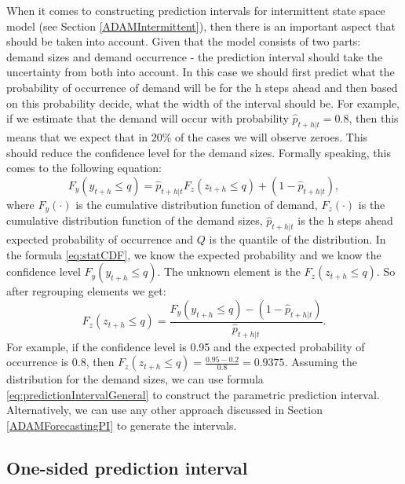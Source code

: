\documentclass[
]{book}
\theoremstyle{definition}
\theoremstyle{definition}
\theoremstyle{definition}
\theoremstyle{definition}
\theoremstyle{remark}
\begin{document}
When it comes to constructing prediction intervals for intermittent state space model (see Section \ref{ADAMIntermittent}), then there is an important aspect that should be taken into account. Given that the model consists of two parts: demand sizes and demand occurrence - the prediction interval should take the uncertainty from both into account. In this case we should first predict what the probability of occurrence of demand will be for the h steps ahead and then based on this probability decide, what the width of the interval should be. For example, if we estimate that the demand will occur with probability \(\hat{p}_{t+h|t} = 0.8\), then this means that we expect that in 20\% of the cases we will observe zeroes. This should reduce the confidence level for the demand sizes. Formally speaking, this comes to the following equation:
\begin{equation}
    F_y(y_{t+h} \leq q) = \hat{p}_{t+h|t} F_z(z_{t+h} \leq q) +(1 -\hat{p}_{t+h|t}),
    \label{eq:statCDF}
\end{equation}
where \(F_y(\cdot)\) is the cumulative distribution function of demand, \(F_z(\cdot)\) is the cumulative distribution function of the demand sizes, \(\hat{p}_{t+h|t}\) is the h steps ahead expected probability of occurrence and \(Q\) is the quantile of the distribution. In the formula \eqref{eq:statCDF}, we know the expected probability and we know the confidence level \(F_y(y_{t+h} \leq q)\). The unknown element is the \(F_z(z_{t+h} \leq q)\). So after regrouping elements we get:
\begin{equation}
    F_z(z_{t+h} \leq q) = \frac{F_y(y_{t+h} \leq q) -(1 -\hat{p}_{t+h|t})}{\hat{p}_{t+h|t}}.
    \label{eq:statCDFDemandSizes}
\end{equation}
For example, if the confidence level is 0.95 and the expected probability of occurrence is 0.8, then \(F_z(z_{t+h} \leq q) = \frac{0.95 - 0.2}{0.8} = 0.9375\). Assuming the distribution for the demand sizes, we can use formula \eqref{eq:predictionIntervalGeneral} to construct the parametric prediction interval. Alternatively, we can use any other approach discussed in Section \ref{ADAMForecastingPI} to generate the intervals.

\hypertarget{forecastingADAMOtherOneSided}{%
\subsection{One-sided prediction interval}\label{forecastingADAMOtherOneSided}}
\end{document}
